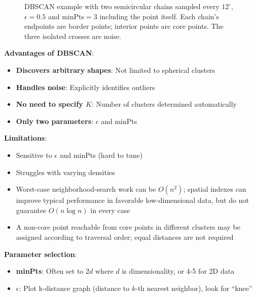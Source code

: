 \documentclass[11pt,twoside]{article}
\numberwithin{equation}{section}
\theoremstyle{plain}
\theoremstyle{definition}
\theoremstyle{remark}
\newenvironment{keyidea}{
  \begin{tcolorbox}[colback=yellow!5!white,
                    colframe=yellow!50!black,
                    title=Key Idea,
                    breakable,
                    enhanced,
                    sharp corners,
                    boxrule=0.8pt,
                    left=6pt, right=6pt, top=6pt, bottom=6pt]
}{
  \end{tcolorbox}
}
\begin{document}
\begin{figure}[H]
\centering
{}
\caption{DBSCAN example with two semicircular chains sampled every $12^\circ$, $\epsilon=0.5$ and minPts$=3$ including the point itself. Each chain's endpoints are border points; interior points are core points. The three isolated crosses are noise.}
\end{figure}

\begin{keyidea}
\textbf{Advantages of DBSCAN}:
\begin{itemize}
\item \textbf{Discovers arbitrary shapes}: Not limited to spherical clusters
\item \textbf{Handles noise}: Explicitly identifies outliers
\item \textbf{No need to specify $K$}: Number of clusters determined automatically
\item \textbf{Only two parameters}: $\epsilon$ and minPts
\end{itemize}

\textbf{Limitations}:
\begin{itemize}
\item Sensitive to $\epsilon$ and minPts (hard to tune)
\item Struggles with varying densities
\item Worst-case neighborhood-search work can be $O(n^2)$; spatial indexes can improve typical performance in favorable low-dimensional data, but do not guarantee $O(n\log n)$ in every case
\item A non-core point reachable from core points in different clusters may be assigned according to traversal order; equal distances are not required
\end{itemize}

\textbf{Parameter selection}:
\begin{itemize}
\item \textbf{minPts}: Often set to $2d$ where $d$ is dimensionality, or 4-5 for 2D data
\item \textbf{$\epsilon$}: Plot k-distance graph (distance to $k$-th nearest neighbor), look for ``knee''
\end{itemize}
\end{keyidea}
\end{document}
